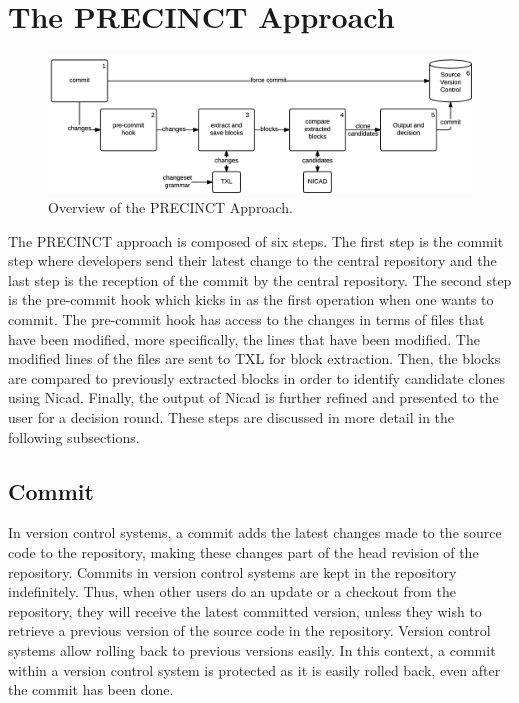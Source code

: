 \documentclass[conference]{IEEEtran}
\begin{document}
\section{The PRECINCT Approach}
\label{sec:The PRECINCT Approach}

\begin{figure}
  \centering
    \includegraphics[width=\textwidth]{media/approach.png}
    \caption{ Overview of the PRECINCT Approach.\label{fig:precinct-approach}}
\end{figure}

The PRECINCT approach is composed of six steps. The first step is the commit step where developers send their latest change to the central repository and the last step is the reception of the commit by the central repository. The second step is the pre-commit hook which kicks in as the first operation when one wants to commit. The pre-commit hook has access to the changes in terms of files that have been modified, more specifically, the lines that have been modified. The modified lines of the files are sent to TXL\cite{Cordy2006a} for block extraction. Then, the blocks are compared to previously extracted blocks in order to identify candidate clones  using Nicad\cite{Cordy2011}. Finally, the output of Nicad is further refined and presented to the user for a decision round. These steps are discussed in more detail in the following subsections.

\subsection{Commit}
\label{sub:Commit}

In version control systems, a commit adds the latest changes made to the source code to the repository, making these changes part of the head revision of the repository. Commits in version control systems are kept in the repository indefinitely. Thus, when other users do an update or a checkout from the repository, they will receive the latest committed version, unless they wish to retrieve a previous version of the source code in the repository. Version control systems allow rolling back to previous versions easily. In this context, a commit within a version control system is protected as it is easily rolled back, even after the commit has been done.
\end{document}
